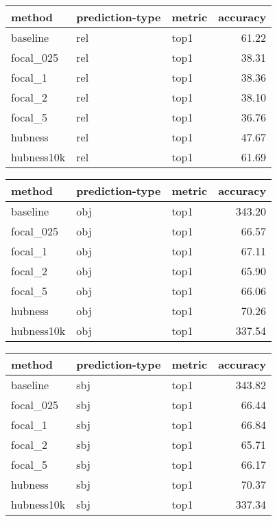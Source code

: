 \begin{tabular}{lllr}
\toprule
     method & prediction-type & metric &  accuracy \\
\midrule
   baseline &             rel &   top1 &     61.22 \\
  focal\_025 &             rel &   top1 &     38.31 \\
    focal\_1 &             rel &   top1 &     38.36 \\
    focal\_2 &             rel &   top1 &     38.10 \\
    focal\_5 &             rel &   top1 &     36.76 \\
    hubness &             rel &   top1 &     47.67 \\
 hubness10k &             rel &   top1 &     61.69 \\
\bottomrule
\end{tabular}
\begin{tabular}{lllr}
\toprule
     method & prediction-type & metric &  accuracy \\
\midrule
   baseline &             obj &   top1 &    343.20 \\
  focal\_025 &             obj &   top1 &     66.57 \\
    focal\_1 &             obj &   top1 &     67.11 \\
    focal\_2 &             obj &   top1 &     65.90 \\
    focal\_5 &             obj &   top1 &     66.06 \\
    hubness &             obj &   top1 &     70.26 \\
 hubness10k &             obj &   top1 &    337.54 \\
\bottomrule
\end{tabular}
\begin{tabular}{lllr}
\toprule
     method & prediction-type & metric &  accuracy \\
\midrule
   baseline &             sbj &   top1 &    343.82 \\
  focal\_025 &             sbj &   top1 &     66.44 \\
    focal\_1 &             sbj &   top1 &     66.84 \\
    focal\_2 &             sbj &   top1 &     65.71 \\
    focal\_5 &             sbj &   top1 &     66.17 \\
    hubness &             sbj &   top1 &     70.37 \\
 hubness10k &             sbj &   top1 &    337.34 \\
\bottomrule
\end{tabular}

